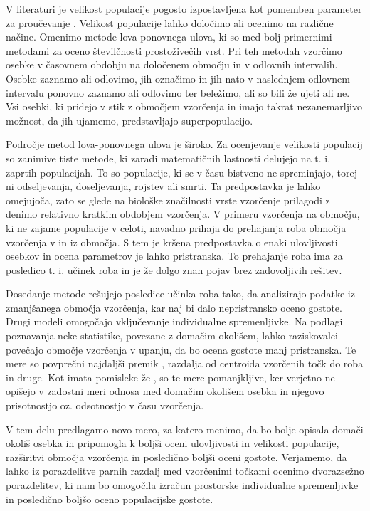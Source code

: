 V literaturi je velikost populacije pogosto izpostavljena kot pomemben parameter za proučevanje \citep{kindberg_estimating_2011, chandler_spatially_2013, jimenez_spatial_2017, moqanaki_counting_2018}. Velikost populacije lahko določimo ali ocenimo na različne načine. Omenimo metode lova-ponovnega ulova, ki so med bolj primernimi metodami za oceno številčnosti prostoživečih vrst. Pri teh metodah vzorčimo osebke v časovnem obdobju na določenem območju in v odlovnih intervalih. Osebke zaznamo ali odlovimo, jih označimo in jih nato v naslednjem odlovnem intervalu ponovno zaznamo ali odlovimo ter beležimo, ali so bili že ujeti ali ne. Vsi osebki, ki pridejo v stik z območjem vzorčenja in imajo takrat nezanemarljivo možnost, da jih ujamemo, predstavljajo superpopulacijo.

Področje metod lova-ponovnega ulova je široko. Za ocenjevanje velikosti populacij so zanimive tiste metode, ki zaradi matematičnih lastnosti delujejo na t. i. zaprtih populacijah. To so populacije, ki se v času bistveno ne spreminjajo, torej ni odseljevanja, doseljevanja, rojstev ali smrti. Ta predpostavka je lahko omejujoča, zato se glede na biološke značilnosti vrste vzorčenje prilagodi z denimo relativno kratkim obdobjem vzorčenja. V primeru vzorčenja na območju, ki ne zajame populacije v celoti, navadno prihaja do prehajanja roba območja vzorčenja v in iz območja. S tem je kršena predpostavka o enaki ulovljivosti osebkov in ocena parametrov je lahko pristranska. To prehajanje roba ima za posledico t. i. učinek roba in je že dolgo znan pojav brez zadovoljivih rešitev.

Dosedanje metode rešujejo posledice učinka roba tako, da analizirajo podatke iz zmanjšanega območja vzorčenja, kar naj bi dalo nepristransko oceno gostote. Drugi modeli omogočajo vključevanje individualne spremenljivke. Na podlagi poznavanja neke statistike, povezane z domačim okolišem, lahko raziskovalci povečajo območje vzorčenja v upanju, da bo ocena gostote manj pristranska. Te mere so povprečni najdaljši premik \citep{wilson_evaluation_1985}, razdalja od centroida vzorčenih točk do roba \citep{whittington_comparison_2015} in druge. Kot imata pomisleke že \citet{whittington_comparison_2015}, so te mere pomanjkljive, ker verjetno ne opišejo v zadostni meri odnosa med domačim okolišem osebka in njegovo prisotnostjo oz. odsotnostjo v času vzorčenja.

V tem delu predlagamo novo mero, za katero menimo, da bo bolje opisala domači okoliš osebka in pripomogla k boljši oceni ulovljivosti in velikosti populacije, razširitvi območja vzorčenja in posledično boljši oceni gostote. Verjamemo, da lahko iz porazdelitve parnih razdalj med vzorčenimi točkami ocenimo dvorazsežno porazdelitev, ki nam bo omogočila izračun prostorske individualne spremenljivke in posledično boljšo oceno populacijske gostote.

